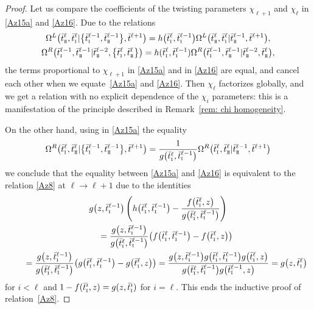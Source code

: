 \documentclass[10pt,a4paper]{amsart}
\newcommand{\so}{\scriptscriptstyle \rm I}
\newcommand{\st}{\scriptscriptstyle \rm I\hspace{-1pt}I}
\newcommand{\bt}{{\bar t}}
\theoremstyle{definition}
\def\r#1{\eqref{#1}}
\def\vk{\chi}
\def\Oml{\Omega^L}
\def\Omr{\Omega^R}
\begin{document}
\begin{proof}
Let us compare the coefficients of the twisting parameters $\vk_{\ell+1}$
and $\vk_\ell$ in \r{Az15a} and \r{Az16}.
Due to the relations
\begin{gather*}
\Oml\bigl(\bt^\ell_{\st},\bt^\ell_{\so}|\bigl\{\bt^{\ell-1}_{\so},\bt^{\ell-1}_{\st}\bigr\},\bt^{\ell+1}\bigr)=
h\bigl(\bt^\ell_{\so},\bt^{\ell-1}_{\so}\bigr)
\Oml\bigl(\bt^\ell_{\st},\bt^\ell_{\so}|\bt^{\ell-1}_{\st},\bt^{\ell+1}\bigr),\\
 \Omr\bigl(\bt^{\ell-1}_{\so},\bt^{\ell-1}_{\st}|\bt^{\ell-2}_{\st},\bigl\{\bt^{\ell}_{\so},\bt^\ell_{\st}\bigr\}\bigr)=
h(\bt^\ell_{\so},\bt^{\ell-1}_{\so})
\Omr\bigl(\bt^{\ell-1}_{\so},\bt^{\ell-1}_{\st}|\bt^{\ell-2}_{\st},\bt^{\ell}_{\st}\bigr),
\end{gather*}
the terms proportional to $\vk_{\ell+1}$
in \r{Az15a} and in \r{Az16} are equal, and cancel each other when we equate~\r{Az15a} and \r{Az16}. Then $\chi_\ell$ factorizes globally, and we get a relation with no explicit dependence of the $\chi_i$ parameters:
this is a manifestation of the
principle described in Remark~\ref{rem: chi homogeneity}.


On the other hand, using in \r{Az15a} the equality
\begin{equation*}
\Omr\bigl(\bt^\ell_{\so},\bt^\ell_{\st}|\bigl\{\bt^{\ell-1}_{\so},\bt^{\ell-1}_{\st}\bigr\},\bt^{\ell+1}\bigr)=
\frac{1}{g\bigl(\bt^\ell_{\so},\bt^{\ell-1}_{\so}\bigr)}
\Omr\bigl(\bt^\ell_{\so},\bt^\ell_{\st}|\bt^{\ell-1}_{\st},\bt^{\ell+1}\bigr)
\end{equation*}
we conclude that the equality between \r{Az15a} and \r{Az16} is
equivalent to the relation \r{Az8} at $\ell\to \ell+1$ due to the identities
\begin{gather}
g\bigl(z,\bt^{\ell-1}_{\so}\bigr)\left(h\bigl(\bt^\ell_{\so},\bt^{\ell-1}_{\so}\bigr)-
\frac{f\bigl(\bt^\ell_{\so},z\bigr)}{g\bigl(\bt^\ell_{\so},\bt^{\ell-1}_{\so}\bigr)}\right)\nonumber\\
\qquad=
\frac{g\bigl(z,\bt^{\ell-1}_{\so}\bigr)}
{g\bigl(\bt^\ell_{\so},\bt^{\ell-1}_{\so}\bigr)}\bigl(f\bigl(\bt^\ell_{\so},\bt^{\ell-1}_{\so}\bigr)-
f\bigl(\bt^\ell_{\so},z\bigr)\bigr)\nonumber
\\
\qquad=\frac{g\bigl(z,\bt^{\ell-1}_{\so}\bigr)}
{g\bigl(\bt^\ell_{\so},\bt^{\ell-1}_{\so}\bigr)}\bigl(g\bigl(\bt^\ell_{\so},\bt^{\ell-1}_{\so}\bigr)-
g\bigl(\bt^\ell_{\so},z\bigr)\bigr)=
\frac{g\bigl(z,\bt^{\ell-1}_{\so}\bigr) g\bigl(\bt^\ell_{\so},\bt^{\ell-1}_{\so}\bigr)
g\bigl(\bt^\ell_{\so},z\bigr)}
{g\bigl(\bt^\ell_{\so},\bt^{\ell-1}_{\so}\bigr) g\bigl(\bt^{\ell-1}_{\so},z\bigr)}=
g\bigl(z,\bt^{\ell}_{\so}\bigr)\label{simp}
\end{gather}
 for $i<\ell$ and
$ 1 - f(\bt^{i}_{\so}, z) = g(z, \bt^{i}_{\so})$
for $i=\ell$.
This ends the inductive proof of relation~\eqref{Az8}. \end{proof}
\end{document}
